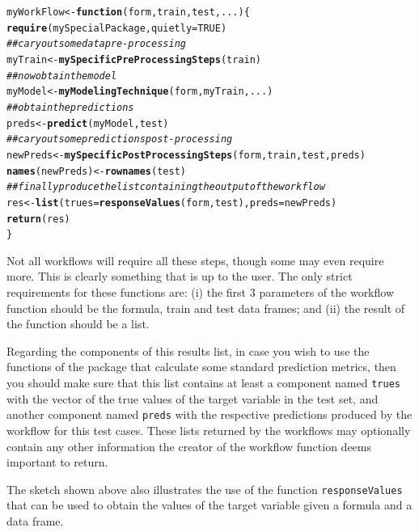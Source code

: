 \documentclass[10pt,a4paper]{article}\usepackage[]{graphicx}\usepackage[]{color}
\makeatletter
\newcommand{\hlnum}[1]{\textcolor[rgb]{0.686,0.059,0.569}{#1}}%
\newcommand{\hlcom}[1]{\textcolor[rgb]{0.678,0.584,0.686}{\textit{#1}}}%
\newcommand{\hlstd}[1]{\textcolor[rgb]{0.345,0.345,0.345}{#1}}%
\newcommand{\hlkwa}[1]{\textcolor[rgb]{0.161,0.373,0.58}{\textbf{#1}}}%
\newcommand{\hlkwb}[1]{\textcolor[rgb]{0.69,0.353,0.396}{#1}}%
\newcommand{\hlkwc}[1]{\textcolor[rgb]{0.333,0.667,0.333}{#1}}%
\newcommand{\hlkwd}[1]{\textcolor[rgb]{0.737,0.353,0.396}{\textbf{#1}}}%
\newenvironment{kframe}{%
 \def\at@end@of@kframe{}%
 \ifinner\ifhmode%
  \def\at@end@of@kframe{\end{minipage}}%
  \begin{minipage}{\columnwidth}%
 \fi\fi%
 \def\FrameCommand##1{\hskip\@totalleftmargin \hskip-\fboxsep
 \colorbox{shadecolor}{##1}\hskip-\fboxsep
     \hskip-\linewidth \hskip-\@totalleftmargin \hskip\columnwidth}%
 \MakeFramed {\advance\hsize-\width
   \@totalleftmargin\z@ \linewidth\hsize
   \@setminipage}}%
 {\par\unskip\endMakeFramed%
 \at@end@of@kframe}
\newenvironment{knitrout}{}{} %
\makeatother
\begin{document}
\begin{knitrout}\footnotesize
{}\color{fgcolor}\begin{kframe}
\begin{alltt}
\hlstd{myWorkFlow} \hlkwb{<-} \hlkwa{function}\hlstd{(}\hlkwc{form}\hlstd{,}\hlkwc{train}\hlstd{,}\hlkwc{test}\hlstd{,}\hlkwc{...}\hlstd{) \{}
  \hlkwd{require}\hlstd{(mySpecialPackage,}\hlkwc{quietly}\hlstd{=}\hlnum{TRUE}\hlstd{)}
  \hlcom{## cary out some data pre-processing}
  \hlstd{myTrain} \hlkwb{<-} \hlkwd{mySpecificPreProcessingSteps}\hlstd{(train)}
  \hlcom{## now obtain the model}
  \hlstd{myModel} \hlkwb{<-} \hlkwd{myModelingTechnique}\hlstd{(form,myTrain,...)}
  \hlcom{## obtain the predictions}
  \hlstd{preds} \hlkwb{<-} \hlkwd{predict}\hlstd{(myModel,test)}
  \hlcom{## cary out some predictions post-processing}
  \hlstd{newPreds} \hlkwb{<-} \hlkwd{mySpecificPostProcessingSteps}\hlstd{(form,train,test,preds)}
  \hlkwd{names}\hlstd{(newPreds)} \hlkwb{<-} \hlkwd{rownames}\hlstd{(test)}
  \hlcom{## finally produce the list containing the output of the workflow}
  \hlstd{res} \hlkwb{<-} \hlkwd{list}\hlstd{(}\hlkwc{trues}\hlstd{=}\hlkwd{responseValues}\hlstd{(form,test),}\hlkwc{preds}\hlstd{=newPreds)}
  \hlkwd{return}\hlstd{(res)}
\hlstd{\}}
\end{alltt}
\end{kframe}
\end{knitrout}


Not all workflows will require all these steps, though some may even
require more. This is clearly something that is up to the user. The
only strict requirements for these functions are: (i) the first 3
parameters of the workflow function should be the formula, train and
test data frames; and (ii) the result of the function should be a list. 

Regarding the components of this results list, in case you wish to use the functions of the package that calculate some standard prediction metrics, then you should make sure that this list contains at least a component named \texttt{trues} with the vector of the true values of the target variable in the test set, and another component named \texttt{preds} with the respective predictions produced by the workflow for this test cases.
 These lists returned by the workflows  may optionally contain any other information the creator of the workflow function deems
important to return. 

The sketch shown above also illustrates the use of the function
\texttt{responseValues} that can be used to obtain the values of the target
variable given a formula and a data frame.
\end{document}
